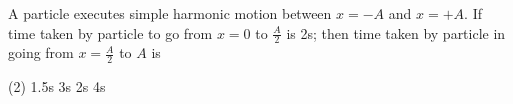 \item A particle executes simple harmonic motion between \( x = -A \) and \( x = +A \). If time taken by particle to go from \( x = 0 \) to \( \frac{A}{2} \) is 2s; then time taken by particle in going from \( x = \frac{A}{2} \) to \( A \) is
    \begin{tasks}(2)
        \task 1.5s
        \task 3s
        \task 2s
        \task 4s
    \end{tasks}